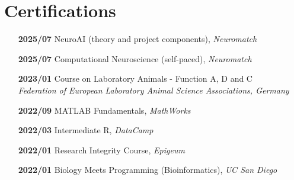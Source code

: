 \documentclass[12pt]{article}
\begin{document}
\section*{Certifications}
\begin{itemize}
    \item[\textbf{2025/07}] NeuroAI (theory and project components), \textit{Neuromatch}
    \item[\textbf{2025/07}] Computational Neuroscience (self-paced), \textit{Neuromatch}
    \item[\textbf{2023/01}] Course on Laboratory Animals - Function A, D and C \\
    \textit{Federation of European Laboratory Animal Science Associations, Germany}
    \item[\textbf{2022/09}] MATLAB Fundamentals, \textit{MathWorks}
    \item[\textbf{2022/03}] Intermediate R, \textit{DataCamp}
    \item[\textbf{2022/01}] Research Integrity Course, \textit{Epigeum}
    \item[\textbf{2022/01}] Biology Meets Programming (Bioinformatics), \textit{UC San Diego}
\end{itemize}
\end{document}
